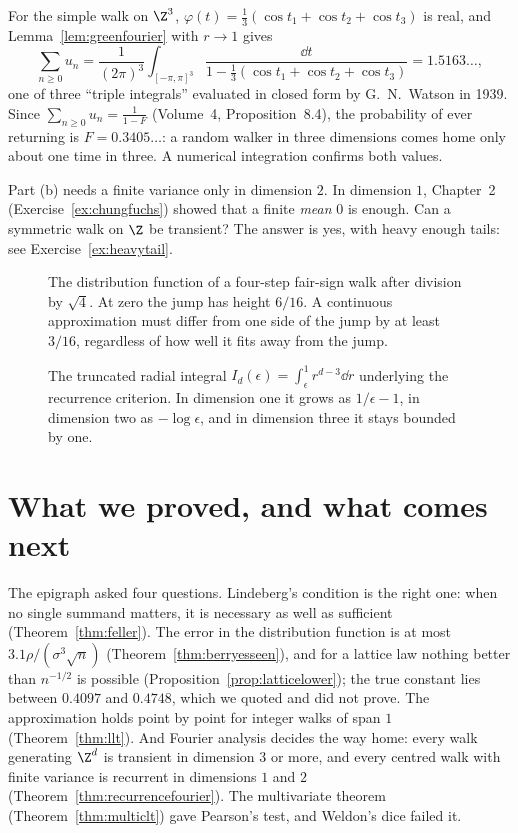\begin{remark}
For the simple walk on $\Z^3$, $\varphi(t)=\frac13(\cos t_1+\cos t_2+\cos t_3)$ is real, and Lemma~\ref{lem:greenfourier} with $r\to1$ gives
\[
\sum_{n\ge0}u_n=\frac1{(2\pi)^3}\int_{[-\pi,\pi]^3}\frac{\dd t}{1-\frac13(\cos t_1+\cos t_2+\cos t_3)}=1.5163\ldots,
\]
one of three ``triple integrals'' evaluated in closed form by G.~N.~Watson in 1939. Since $\sum_{n\ge0}u_n=\frac1{1-F}$ (Volume~4, Proposition~8.4), the
probability of ever returning is $F=0.3405\ldots$: a random walker in three dimensions comes home only about one time in three. A numerical
integration confirms both values.
\end{remark}

\begin{think}
Part (b) needs a finite variance only in dimension $2$. In dimension $1$, Chapter~2 (Exercise~\ref{ex:chungfuchs}) showed that a finite \emph{mean}
$0$ is enough. Can a symmetric walk on $\Z$ be transient? The answer is yes, with heavy enough tails: see Exercise~\ref{ex:heavytail}.
\end{think}

\begin{figure}[ht]
\centering{}
\caption{The distribution function of a four-step fair-sign walk after division by $\sqrt4$. At zero the jump has height $6/16$. A continuous approximation must differ from one side of the jump by at least $3/16$, regardless of how well it fits away from the jump.}
\label{fig:v11-ch04-lattice-jump}
\end{figure}

\begin{figure}[ht]
\centering{}
\caption{The truncated radial integral $I_d(\epsilon)=\int_\epsilon^1 r^{d-3}\dd r$ underlying the recurrence criterion. In dimension one it grows as $1/\epsilon-1$, in dimension two as $-\log\epsilon$, and in dimension three it stays bounded by one.}
\label{fig:v11-ch04-radial-integral}
\end{figure}

\section{What we proved, and what comes next}

The epigraph asked four questions. Lindeberg's condition is the right one: when no single summand matters, it is necessary as well as sufficient
(Theorem~\ref{thm:feller}). The error in the distribution function is at most $3.1\rho/(\sigma^3\sqrt n)$ (Theorem~\ref{thm:berryesseen}), and for a
lattice law nothing better than $n^{-1/2}$ is possible (Proposition~\ref{prop:latticelower}); the true constant lies between $0.4097$ and $0.4748$,
which we quoted and did not prove. The approximation holds point by point for integer walks of span $1$ (Theorem~\ref{thm:llt}). And Fourier
analysis decides the way home: every walk generating $\Z^d$ is transient in dimension $3$ or more, and every centred walk with finite variance is
recurrent in dimensions $1$ and $2$ (Theorem~\ref{thm:recurrencefourier}). The multivariate theorem (Theorem~\ref{thm:multiclt}) gave Pearson's test,
and Weldon's dice failed it.

